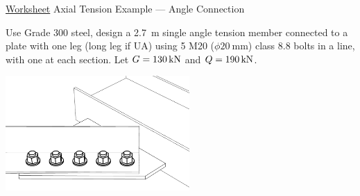 \begin{exmp}\href{run:./WORKSHEET/CH03/EX3.ATAC.sm}{Worksheet}
Axial Tension Example --- Angle Connection

Use Grade 300 steel, design a \SI{2.7}{\meter} single angle tension member connected to a plate with one leg (long leg if UA) using 5 M20 ($\phi\SI{20}{\mm}$) class 8.8 bolts in a line, with one at each section. Let $G=\SI{130}{\kilo\newton}$ and $Q=\SI{190}{\kilo\newton}$.

\includegraphics[width=7cm]{PIC/CH03/ANGLE}
\end{exmp}
